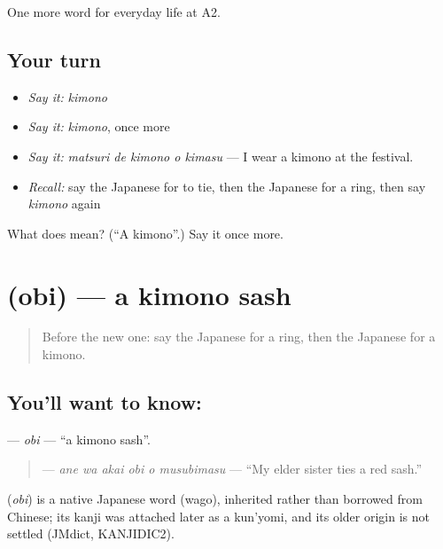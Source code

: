 \begin{grammarlens}[title={What you've built}]
One more word for everyday life at A2.
\end{grammarlens}

\subsection*{Your turn}
\begin{itemize}
\raggedright
  \item \emph{Say it:} \emph{kimono}
  \item \emph{Say it:} \emph{kimono}, once more
  \item \emph{Say it:} \emph{matsuri de kimono o kimasu} — I wear a kimono at the festival.
  \item \emph{Recall:} say the Japanese for to tie, then the Japanese for a ring, then say \emph{kimono} again
\end{itemize}

\begin{tcolorbox}[breakable,colback=teal!4,colframe=teal!35!black,title={Before you move on}]
What does  mean? (\textquotedblleft{}A kimono\textquotedblright{}.) Say it once more.
\end{tcolorbox}
\section[\texorpdfstring{\ja{おび} (obi)}{おび (obi)}]{ (obi) — a kimono sash}

\label{lesson:JA-C151-obi}



\begin{quote}
Before the new one: say the Japanese for a ring, then the Japanese for a kimono.
\end{quote}

\subsection*{You'll want to know: }
\textbf{} — \emph{obi} — \textquotedblleft{}a kimono sash\textquotedblright{}.

\begin{quote}
\textbf{   } — \emph{ane wa akai obi o musubimasu} — \textquotedblleft{}My elder sister ties a red sash.\textquotedblright{}
\end{quote}

\begin{cousinweb}
\textbf{} (\emph{obi}) is a native Japanese word (wago), inherited rather than borrowed from Chinese; its kanji was attached later as a kun'yomi, and its older origin is not settled (JMdict, KANJIDIC2).
\end{cousinweb}

